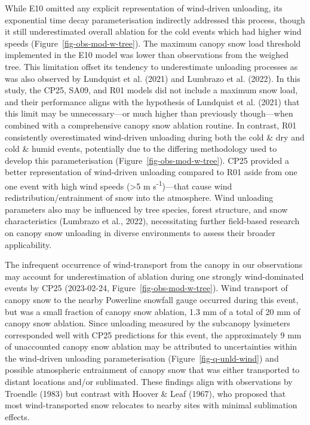 \documentclass[
]{agujournal2019}
\begin{document}
While E10 omitted any explicit representation of wind-driven unloading,
its exponential time decay parameterisation indirectly addressed this
process, though it still underestimated overall ablation for the cold
events which had higher wind speeds (Figure~\ref{fig-obs-mod-w-tree}).
The maximum canopy snow load threshold implemented in the E10 model was
lower than observations from the weighed tree. This limitation offset
its tendency to underestimate unloading processes as was also observed
by Lundquist et al. (2021) and Lumbrazo et al. (2022). In this study,
the CP25, SA09, and R01 models did not include a maximum snow load, and
their performance aligns with the hypothesis of Lundquist et al. (2021)
that this limit may be unnecessary---or much higher than previously
though---when combined with a comprehensive canopy snow ablation
routine. In contrast, R01 consistently overestimated wind-driven
unloading during both the cold \& dry and cold \& humid events,
potentially due to the differing methodology used to develop this
parameterisation (Figure~\ref{fig-obs-mod-w-tree}). CP25 provided a
better representation of wind-driven unloading compared to R01 aside
from one one event with high wind speeds (\textgreater5 m
s\textsuperscript{-1})---that cause wind redistribution/entrainment of
snow into the atmosphere. Wind unloading parameters also may be
influenced by tree species, forest structure, and snow characteristics
(Lumbrazo et al., 2022), necessitating further field-based research on
canopy snow unloading in diverse environments to assess their broader
applicability.

The infrequent occurrence of wind-transport from the canopy in our
observations may account for underestimation of ablation during one
strongly wind-dominated events by CP25 (2023-02-24,
Figure~\ref{fig-obs-mod-w-tree}). Wind transport of canopy snow to the
nearby Powerline snowfall gauge occurred during this event, but was a
small fraction of canopy snow ablation, 1.3 mm of a total of 20 mm of
canopy snow ablation. Since unloading measured by the subcanopy
lysimeters corresponded well with CP25 predictions for this event, the
approximately 9 mm of unaccounted canopy snow ablation may be attributed
to uncertainties within the wind-driven unloading parameterisation
(Figure~\ref{fig-q-unld-wind}) and possible atmospheric entrainment of
canopy snow that was either transported to distant locations and/or
sublimated. These findings align with observations by Troendle (1983)
but contrast with Hoover \& Leaf (1967), who proposed that most
wind-transported snow relocates to nearby sites with minimal sublimation
effects.
\end{document}
